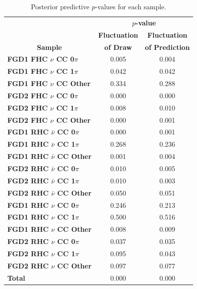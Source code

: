 \begin{center}
\begin{table}[!htbp]
\center
\begin{tabular}{l||c c}
\hline \hline
& \multicolumn{2}{c}{\textbf{$p$-value}} \\
& \multicolumn{1}{c}{\textbf{Fluctuation}} & \multicolumn{1}{c}{\textbf{Fluctuation}} \\
\multicolumn{1}{c||}{\textbf{Sample}} & \multicolumn{1}{c}{\textbf{of Draw}} & \multicolumn{1}{c}{\textbf{of Prediction}} \\
\hline\hline
\textbf{FGD1 FHC $\nu$ CC 0$\pi$} & 0.005 & 0.004\\ 
\textbf{FGD1 FHC $\nu$ CC 1$\pi$} & 0.042 & 0.042\\
\textbf{FGD1 FHC $\nu$ CC Other} & 0.334 & 0.288\\ \hline
\textbf{FGD2 FHC $\nu$ CC 0$\pi$} & 0.000 & 0.000\\ 
\textbf{FGD2 FHC $\nu$ CC 1$\pi$} & 0.008 & 0.010\\ 
\textbf{FGD2 FHC $\nu$ CC Other} & 0.000 & 0.001\\ \hline
\textbf{FGD1 RHC $\bar{\nu}$ CC 0$\pi$} & 0.000 & 0.001\\
\textbf{FGD1 RHC $\bar{\nu}$ CC 1$\pi$} & 0.268 & 0.236\\
\textbf{FGD1 RHC $\bar{\nu}$ CC Other} & 0.001 & 0.004\\ \hline
\textbf{FGD2 RHC $\bar{\nu}$ CC 0$\pi$} & 0.010 & 0.005\\
\textbf{FGD2 RHC $\bar{\nu}$ CC 1$\pi$} & 0.010 & 0.003\\
\textbf{FGD2 RHC $\bar{\nu}$ CC Other} & 0.050 & 0.051\\ \hline
\textbf{FGD1 RHC $\nu$ CC 0$\pi$} & 0.246 & 0.213\\
\textbf{FGD1 RHC $\nu$ CC 1$\pi$} & 0.500 & 0.516\\
\textbf{FGD1 RHC $\nu$ CC Other} & 0.008 & 0.009\\ \hline
\textbf{FGD2 RHC $\nu$ CC 0$\pi$} & 0.037 & 0.035\\
\textbf{FGD2 RHC $\nu$ CC 1$\pi$} & 0.095 & 0.043\\
\textbf{FGD2 RHC $\nu$ CC Other} & 0.097 & 0.077\\ \hline
\textbf{Total} & 0.000 & 0.000 \\ \hline\hline
\end{tabular}
\caption{Posterior predictive $p$-values for each sample.}
\label{tab:pval}
\end{table}
\end{center}

